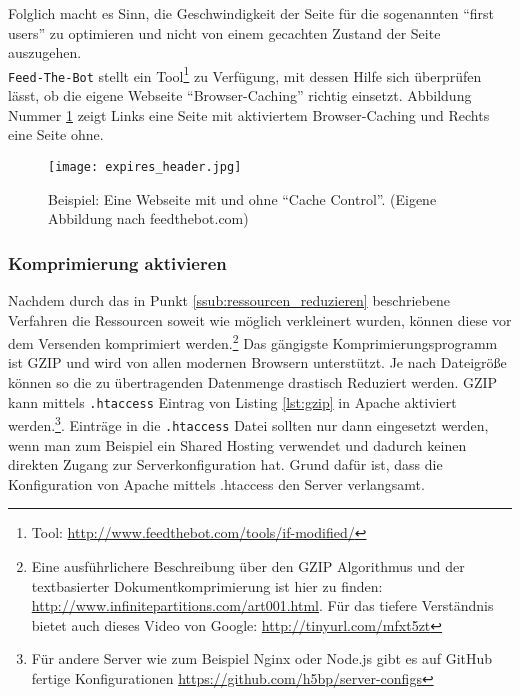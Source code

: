 			Folglich macht es Sinn, die Geschwindigkeit der Seite für die sogenannten "`first users"' zu optimieren und nicht von einem gecachten Zustand der Seite auszugehen.\\
			\texttt{Feed-The-Bot} stellt ein Tool\footnote{Tool: \url{http://www.feedthebot.com/tools/if-modified/}} zu Verfügung, mit dessen Hilfe sich überprüfen lässt, ob die eigene Webseite "`Browser-Caching"' richtig einsetzt. Abbildung Nummer \ref{fig:expires_header} zeigt Links eine Seite mit aktiviertem Browser-Caching und Rechts eine Seite ohne.
		  \begin{figure}[htbp]
		  	\begin{center}
		  		\texttt{[image: expires\_header.jpg]}
		  		\caption{Beispiel: Eine Webseite mit und ohne "`Cache Control"'. (Eigene Abbildung nach feedthebot.com)}
		  		\label{fig:expires_header}
		  	\end{center}
		  \end{figure}
		\pagebreak

		\subsubsection{Komprimierung aktivieren} %
		\label{ssub:komprimierung_aktivieren}
			Nachdem durch das in Punkt \ref{ssub:ressourcen_reduzieren} beschriebene Verfahren die Ressourcen soweit wie möglich verkleinert wurden, können diese vor dem Versenden komprimiert werden.\footnote{Eine ausführlichere Beschreibung über den GZIP Algorithmus und der textbasierter Dokumentkomprimierung ist hier zu finden: \url{http://www.infinitepartitions.com/art001.html}. Für das tiefere Verständnis bietet auch dieses Video von Google: \url{http://tinyurl.com/mfxt5zt}} Das gängigste Komprimierungsprogramm ist GZIP und wird von allen modernen Browsern unterstützt. Je nach Dateigröße können so die zu übertragenden Datenmenge drastisch Reduziert werden. GZIP kann mittels \texttt{.htaccess} Eintrag von Listing \ref{lst:gzip} in Apache aktiviert werden.\footnote{Für andere Server wie zum Beispiel Nginx oder Node.js gibt es auf GitHub fertige Konfigurationen \url{https://github.com/h5bp/server-configs}}. Einträge in die \texttt{.htaccess} Datei sollten nur dann eingesetzt werden, wenn man zum Beispiel ein Shared Hosting verwendet und dadurch keinen direkten Zugang zur Serverkonfiguration hat. Grund dafür ist, dass die Konfiguration von Apache mittels .htaccess den Server verlangsamt.\autocite{apache}

